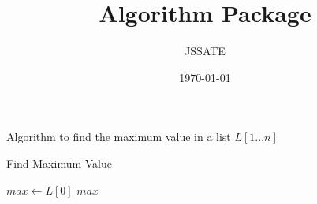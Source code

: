 \documentclass{article}
\title{Algorithm Package}
\author{JSSATE}
\date{\today}
\begin{document}
	\maketitle
	\begin{algorithm}[H]
		Algorithm to find the maximum value in a list $L[1...n]$
		\caption{Find Maximum Value}
		
		$max \leftarrow L[0]$\;
		\Return $max$\;
	\end{algorithm}
\end{document}
